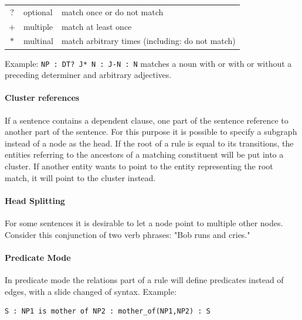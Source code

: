 \documentclass[english]{article}
\begin{document}
\begin{tabular}{cll}
  $\mathbf{?}$ & optional & match once or do not match\\
  $+$ & multiple & match at least once\\
  $*$ & multinal & match arbitrary times (including: do not match)
\end{tabular}

Example: \lstinline{NP : DT? J* N : J-N : N} matches a noun with or with or without a preceding determiner and arbitrary adjectives.


\paragraph{Cluster references}
If a sentence contains a dependent clause, one part of the sentence reference to another part of the sentence. For this purpose it is possible to specify a subgraph instead of a node as the head. If the root of a rule is equal to its transitions, the entities referring to the ancestors of a matching constituent will be put into a cluster. If another entity wants to point to the entity representing the root match, it will point to the cluster instead.

\paragraph{Head Splitting}
For some sentences it is desirable to let a node point to multiple other nodes. Consider this conjunction of two verb phrases: "Bob runs and cries."

\paragraph{Predicate Mode}
In predicate mode the relations part of a rule will define predicates instead of edges, with a slide changed of syntax. Example: 

\begin{lstlisting}
S : NP1 is mother of NP2 : mother_of(NP1,NP2) : S
\end{lstlisting}
\end{document}
